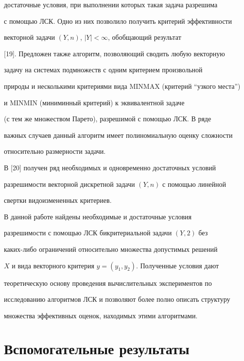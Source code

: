 достаточные условия, при выполнении которых такая задача разрешима 


с помощью ЛСК. Одно из них позволило получить критерий эффективности 


векторной задачи $(Y,n)$, $|Y|<\infty$, обобщающий результат 


[19]. Предложен также алгоритм, позволяющий сводить любую векторную 


задачу на системах подмножеств с одним критерием произвольной 


природы и несколькими критериями вида MINMAX (критерий ``узкого места'') 


и MINMIN (миниминный критерий) к эквивалентной задаче 


(с тем же множеством Парето), разрешимой с помощью ЛСК. В ряде 


важных случаев данный алгоритм имеет полиномиальную оценку сложности 


относительно размерности задачи. 


 


В [20] получен ряд необходимых и одновременно достаточных условий 


разрешимости векторной дискретной задачи $(Y,n)$ с помощью линейной 


свертки видоизмененных критериев. 


 


В данной работе найдены необходимые и достаточные условия 


разрешимости с помощью ЛСК бикритериальной задачи $(Y,2)$ без 


каких-либо ограничений относительно множества допустимых решений 


$X$ и вида векторного критерия $y=(y_1,y_2)$. Полученные условия дают 


теоретическую основу проведения вычислительных экспериментов по 


исследованию алгоритмов ЛСК и позволяют более полно описать структуру 


множества эффективных оценок, находимых этими алгоритмами. 


 


\section{Вспомогательные результаты} 



